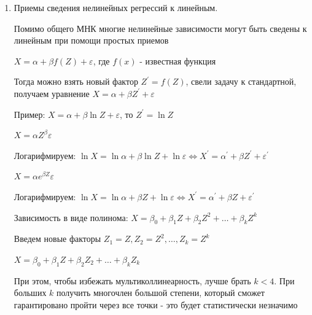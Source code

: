 \documentclass[12pt]{article}
\begin{document}
\begin{enumerate}
    Недостаток у этого метода: нужно знать коэффициенты $v_i$

    \Ex Рассмотрим модель линейной парной регрессии без свободного члена $X = \beta_0 Z + \varepsilon$

    Теоретическое уравнение $A \vec B = Z \vec X$, где $Z = \left(Z_1, \dots, Z_n\right)$ - матрица плана, $\vec B = \hat \beta_0$, $A = Z Z^T = z_1^2 + \dots + z_n^2$, $Z \vec X = z_1 x_1 + \dots + z_n x_n$

    $\sum_{i = 1}^n z^2_i \hat \beta_0 = \sum_{i = 1}^n z_i x_i \Longrightarrow \hat \beta_0 = \frac{\sum_{z_i x_i}}{\sum z^2_i}$ - оценка МНК 

    По взвешенному методу наименьших квадратов $\tilde \beta_0 = \frac{\sum w_i z_i x_i}{\sum w_i z_i^2}$ - оценка взвешенного МНК

    \item Приемы сведения нелинейных регрессий к линейным.

    Помимо общего МНК многие нелинейные зависимости могут быть сведены к линейным при помощи простых приемов

     $X = \alpha + \beta f(Z) + \varepsilon$, где $f(x)$ - известная функция

    Тогда можно взять новый фактор $Z^\prime = f(Z)$, свели задачу к стандартной, получаем уравнение $X = \alpha + \beta Z^\prime + \varepsilon$

    Пример: $X = \alpha + \beta \ln Z + \varepsilon$, то $Z^\prime = \ln Z$

     $X = \alpha Z^\beta \varepsilon$

    Логарифмируем: $\ln X = \ln \alpha + \beta \ln Z + \ln \varepsilon \Longleftrightarrow X^\prime = \alpha^\prime + \beta Z^\prime + \varepsilon^\prime$

     $X = \alpha e^{\beta Z} \varepsilon$

    Логарифмируем: $\ln X = \ln \alpha + \beta Z + \ln \varepsilon \Longleftrightarrow X^\prime = \alpha^\prime + \beta Z + \varepsilon^\prime$

     Зависимость в виде полинома: $X = \beta_0 + \beta_1 Z + \beta_2 Z^2 + \dots + \beta_k Z^k$

    Введем новые факторы $Z_1 = Z, Z_2 = Z^2, \dots, Z_k = Z^k$

    $X = \beta_0 + \beta_1 Z + \beta_2 Z_2 + \dots + \beta_k Z_k$

    При этом, чтобы избежать мультиколлинеарность, лучше брать $k < 4$. При больших $k$ получить многочлен большой степени, который сможет гарантировано пройти через все точки - это будет статистически незначимо


\end{enumerate}
\end{document}
